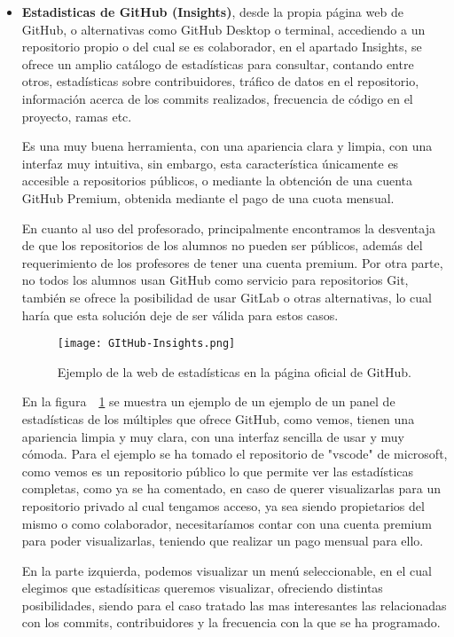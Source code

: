 \begin{itemize}

	\item \textbf{Estadisticas de GitHub (Insights)}, desde la propia página web de GitHub, o alternativas como GitHub Desktop o terminal, accediendo a un repositorio propio o del cual se es colaborador, en el apartado Insights, se ofrece un amplio catálogo de estadísticas para consultar, contando entre otros, estadísticas sobre contribuidores, tráfico de datos en el repositorio, información acerca de los commits realizados, frecuencia de código en el proyecto, ramas etc.

		Es una muy buena herramienta, con una apariencia clara y limpia, con una interfaz muy intuitiva, sin embargo, esta característica únicamente es accesible a repositorios públicos, o mediante la obtención de una cuenta GitHub Premium, obtenida mediante el pago de una cuota mensual. 
		
		En cuanto al uso del profesorado, principalmente encontramos la desventaja de que los repositorios de los alumnos no pueden ser públicos, además del requerimiento de los profesores de tener una cuenta premium. Por otra parte, no todos los alumnos usan GitHub como servicio para repositorios Git, también se ofrece la posibilidad de usar GitLab o otras alternativas, lo cual haría que esta solución deje de ser válida para estos casos.
		


		\begin{figure}[h!]
			\centerline{\texttt{[image: GItHub-Insights.png]}}
			\caption{Ejemplo de la web de estadísticas en la página oficial de GitHub.}
			\label{figure:GithubInsights}
		\end{figure}

		En la figura~~\ref{figure:GithubInsights} se muestra un ejemplo de un ejemplo de un panel de estadísticas de los múltiples que ofrece GitHub, como vemos, tienen una apariencia limpia y muy clara, con una interfaz sencilla de usar y muy cómoda. Para el ejemplo se ha tomado el repositorio de "vscode" de microsoft, como vemos es un repositorio público lo que permite ver las estadísticas completas, como ya se ha comentado, en caso de querer visualizarlas para un repositorio privado al cual tengamos acceso, ya sea siendo propietarios del mismo o como colaborador, necesitaríamos contar con una cuenta premium para poder visualizarlas, teniendo que realizar un pago mensual para ello.
		
		En la parte izquierda, podemos visualizar un menú seleccionable, en el cual elegimos que estadísiticas queremos visualizar, ofreciendo distintas posibilidades, siendo para el caso tratado las mas interesantes las relacionadas con los commits, contribuidores y la frecuencia con la que se ha programado.


\end{itemize}
